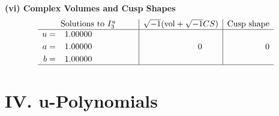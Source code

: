 \documentclass[1p]{elsarticle_modified}
\theoremstyle{definition}
\newcommand{\I}{\sqrt{-1}}
\begin{document}
\newpage\flushleft \textbf{(vi) Complex Volumes and Cusp Shapes}
$$\begin{array}{c|c|c}  
\text{Solutions to }I^u_{3}& \I (\text{vol} + \sqrt{-1}CS) & \text{Cusp shape}\\
 \hline 
\begin{aligned}
u &= \phantom{-}1.00000\phantom{ +0.000000I} \\
a &= \phantom{-}1.00000\phantom{ +0.000000I} \\
b &= \phantom{-}1.00000\phantom{ +0.000000I}\end{aligned}
 & \phantom{-0.000000 } 0 & \phantom{-0.000000 } 0\\
 \hline 
 \end{array}$$\newpage
\newpage\renewcommand{\arraystretch}{1}
\centering \section*{ IV. u-Polynomials}
\end{document}
